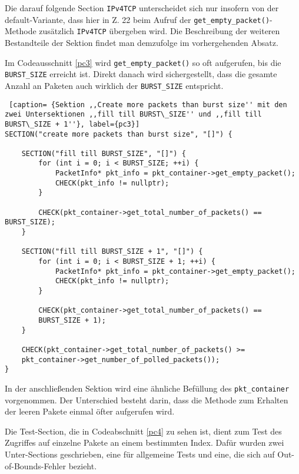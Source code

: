 \documentclass[../review_3.tex]{subfiles}
\begin{document}
Die darauf folgende Section \texttt{IPv4TCP} unterscheidet sich nur insofern von der default-Variante, dass hier in Z. 22 beim Aufruf der \texttt{get\_empty\_packet()}-Methode zusätzlich \texttt{IPv4TCP} übergeben wird. Die Beschreibung der weiteren Bestandteile der Sektion findet man demzufolge im vorhergehenden Absatz.

Im Codeausschnitt \ref{pc3} wird \texttt{get\_empty\_packet()} so oft aufgerufen, bis die \texttt{BURST\_SIZE} erreicht ist. Direkt danach wird sichergestellt, dass die gesamte Anzahl an Paketen auch wirklich der \texttt{BURST\_SIZE} entspricht.

\begin{lstlisting} [caption= {Sektion ,,Create more packets than burst size'' mit den zwei Untersektionen ,,fill till BURST\_SIZE'' und ,,fill till BURST\_SIZE + 1''}, label={pc3}]
SECTION("create more packets than burst size", "[]") {
    
    SECTION("fill till BURST_SIZE", "[]") {
        for (int i = 0; i < BURST_SIZE; ++i) {
            PacketInfo* pkt_info = pkt_container->get_empty_packet();
            CHECK(pkt_info != nullptr);
        }
        
        CHECK(pkt_container->get_total_number_of_packets() == BURST_SIZE);
    }
    
    SECTION("fill till BURST_SIZE + 1", "[]") {
        for (int i = 0; i < BURST_SIZE + 1; ++i) {
            PacketInfo* pkt_info = pkt_container->get_empty_packet();
            CHECK(pkt_info != nullptr);
        }
        
        CHECK(pkt_container->get_total_number_of_packets() ==
        BURST_SIZE + 1);
    }
    
    CHECK(pkt_container->get_total_number_of_packets() >=
    pkt_container->get_number_of_polled_packets());
}\end{lstlisting}

In der anschließenden Sektion wird eine ähnliche Befüllung des \texttt{pkt\_container} vorgenommen. Der Unterschied besteht darin, dass die Methode zum Erhalten der leeren Pakete einmal öfter aufgerufen wird.

Die Test-Section, die in Codeabschnitt \ref{pc4} zu sehen ist, dient zum Test des Zugriffes auf einzelne Pakete an einem bestimmten Index. Dafür wurden zwei Unter-Sections geschrieben, eine für allgemeine Tests und eine, die sich auf Out-of-Bounds-Fehler bezieht.
\end{document}
